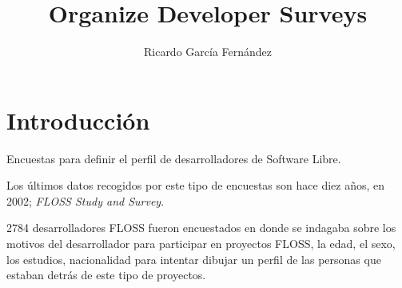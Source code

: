\documentclass[11pt]{article}
\title{\textbf{Organize Developer Surveys}}
\author{Ricardo Garc\'ia Fern\'andez}
\date{}
\begin{document}
\maketitle

\section{Introducci\'on}

Encuestas para definir el perfil de desarrolladores de Software Libre.

Los últimos datos recogidos por este tipo de encuestas son hace diez años, en 2002; \emph{FLOSS Study and Survey}.

2784 desarrolladores FLOSS fueron encuestados en donde se indagaba sobre los motivos del desarrollador para participar en proyectos FLOSS, la edad, el sexo, los estudios, nacionalidad para intentar dibujar un perfil de las personas que estaban detrás de este tipo de proyectos.
\end{document}
